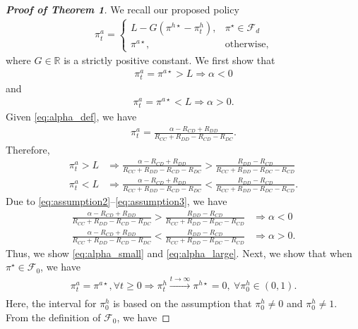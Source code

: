 \documentclass[letterpaper]{article} %
\begin{document}
\begin{proof}[\textbf{Proof of Theorem 1}]
We recall our proposed policy \begin{align}
\label{eq:proposed_policy}
    \pi^a_t=\begin{cases}
        L-G(\pi^{h \star}-\pi^h_t), & \pi^{\star}\in\mathcal{F}_d\\
        \pi^{a \star}, & \textrm{otherwise},
    \end{cases}
\end{align}
where $G \in \mathbb R$ is a strictly positive constant. We first show that
\begin{align}
\label{eq:alpha_small}
    \pi^a_t=\pi^{a \star}>L\Rightarrow\alpha<0
\end{align}
and
\begin{align}
\label{eq:alpha_large}
    \pi^a_t=\pi^{a \star}<L\Rightarrow\alpha>0.
\end{align}
Given \eqref{eq:alpha_def}, we have
\begin{align}
    \pi^a_t=\frac{\alpha-R_{CD}+R_{DD}}{R_{CC}+R_{DD}-R_{CD}-R_{DC}}.
\end{align}
Therefore,
\begin{align}
    \pi^a_t>L&\Rightarrow\frac{\alpha-R_{CD}+R_{DD}}{R_{CC}+R_{DD}-R_{CD}-R_{DC}}>\frac{R_{DD}-R_{CD}}{R_{CC}+R_{DD}-R_{DC}-R_{CD}} \label{eq:alpha_leq_z1}\\
    \pi^a_t<L&\Rightarrow\frac{\alpha-R_{CD}+R_{DD}}{R_{CC}+R_{DD}-R_{CD}-R_{DC}}<\frac{R_{DD}-R_{CD}}{R_{CC}+R_{DD}-R_{DC}-R_{CD}} \label{eq:alpha_geq_z1}.
\end{align}
Due to \eqref{eq:assumption2}--\eqref{eq:assumption3}, we have
\begin{align}
    \frac{\alpha-R_{CD}+R_{DD}}{R_{CC}+R_{DD}-R_{CD}-R_{DC}}>\frac{R_{DD}-R_{CD}}{R_{CC}+R_{DD}-R_{DC}-R_{CD}}&\Rightarrow\alpha<0 \label{eq:alpha_leq_z2} \\
    \frac{\alpha-R_{CD}+R_{DD}}{R_{CC}+R_{DD}-R_{CD}-R_{DC}}<\frac{R_{DD}-R_{CD}}{R_{CC}+R_{DD}-R_{DC}-R_{CD}}&\Rightarrow\alpha>0 \label{eq:alpha_geq_z2}.
\end{align}
Thus, we show \eqref{eq:alpha_small} and \eqref{eq:alpha_large}. Next, we show that when $\pi^\star\in\mathcal{F}_0$, we have
\begin{align}
    \pi^a_t=\pi^{a \star}, \forall t\geq 0\Rightarrow\pi^h_t\xrightarrow[]{t\rightarrow\infty}\pi^{h \star} = 0,\ \forall \pi^h_0\in(0,1).
\end{align}
Here, the interval for $\pi^h_0$ is based on the assumption that $\pi^h_0\neq 0$ and $\pi^h_0\neq 1$. From the definition of $\mathcal{F}_0$, we have

\end{proof}
\end{document}
